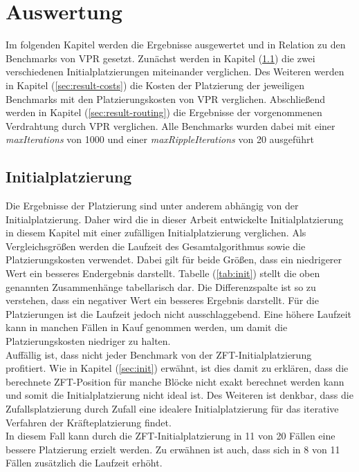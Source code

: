 \chapter{Auswertung}

    Im folgenden Kapitel werden die Ergebnisse ausgewertet und in Relation zu den Benchmarks von VPR gesetzt.
    Zunächst werden in Kapitel (\ref{sec:result-init}) die zwei verschiedenen Initialplatzierungen miteinander
    verglichen. Des Weiteren werden in Kapitel (\ref{sec:result-costs}) die Kosten der Platzierung
    der jeweiligen Benchmarks mit den Platzierungskosten von VPR verglichen.
    Abschließend werden in Kapitel (\ref{sec:result-routing}) die Ergebnisse der vorgenommenen
    Verdrahtung durch VPR verglichen.
    Alle Benchmarks wurden dabei mit einer \textit{maxIterations} von 1000
    und einer \textit{maxRippleIterations} von 20 ausgeführt

    \section{Initialplatzierung}\label{sec:result-init}

        Die Ergebnisse der Platzierung sind unter anderem abhängig von der Initialplatzierung.
        Daher wird die in dieser Arbeit entwickelte Initialplatzierung in diesem Kapitel mit einer
        zufälligen Initialplatzierung verglichen.
        Als Vergleichsgrößen werden die Laufzeit des Gesamtalgorithmus sowie die
        Platzierungskosten verwendet. Dabei gilt für beide Größen,
        dass ein niedrigerer Wert ein besseres Endergebnis darstellt. Tabelle (\ref{tab:init})
        stellt die oben genannten Zusammenhänge tabellarisch dar. Die Differenzspalte ist so zu verstehen,
        dass ein negativer Wert ein besseres Ergebnis darstellt.
        Für die Platzierungen ist die Laufzeit jedoch nicht ausschlaggebend.
        Eine höhere Laufzeit kann in manchen Fällen in Kauf genommen werden, um damit die
        Platzierungskosten niedriger zu halten.
        \\
        Auffällig ist, dass nicht jeder Benchmark von der
        ZFT-Initialplatzierung profitiert. Wie in Kapitel (\ref{sec:init}) erwähnt, ist dies damit zu erklären,
        dass die berechnete ZFT-Position für manche Blöcke nicht exakt berechnet werden kann und somit
        die Initialplatzierung nicht ideal ist. Des Weiteren ist denkbar,
        dass die Zufallsplatzierung durch Zufall eine idealere Initialplatzierung für das iterative
        Verfahren der Kräfteplatzierung findet.
        \\
        In diesem Fall kann durch die ZFT-Initialplatzierung in 11 von 20 Fällen eine bessere
        Platzierung erzielt werden. Zu erwähnen ist auch, dass sich in 8 von 11 Fällen zusätzlich die
        Laufzeit erhöht.

